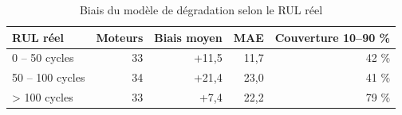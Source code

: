 \begin{table}[htbp]
\centering
\caption{Biais du modèle de dégradation selon le RUL réel}
\label{tab:rul_biais_tranches}
\begin{tabular}{lrrrr}
\toprule
RUL réel & Moteurs & Biais moyen & MAE & Couverture 10–90 \% \\
\midrule
0 – 50 cycles & 33 & +11,5 & 11,7 & 42 \% \\
50 – 100 cycles & 34 & +21,4 & 23,0 & 41 \% \\
> 100 cycles & 33 & +7,4 & 22,2 & 79 \% \\
\bottomrule
\end{tabular}
\end{table}
